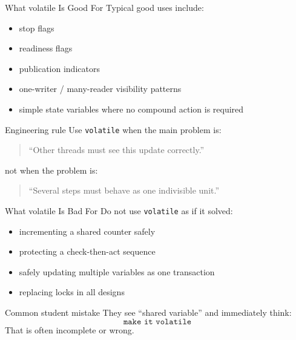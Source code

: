 \documentclass[aspectratio=169,11pt]{beamer}
\begin{document}
	\begin{frame}{What volatile Is Good For}
		Typical good uses include:
		
		\begin{itemize}
			\item stop flags
			\item readiness flags
			\item publication indicators
			\item one-writer / many-reader visibility patterns
			\item simple state variables where no compound action is required
		\end{itemize}
		
		\vspace{0.35cm}
		
		\begin{exampleblock}{Engineering rule}
			Use \texttt{volatile} when the main problem is:
			\begin{quote}
				``Other threads must see this update correctly.''
			\end{quote}
			not when the problem is:
			\begin{quote}
				``Several steps must behave as one indivisible unit.''
			\end{quote}
		\end{exampleblock}
	\end{frame}
	
	\begin{frame}{What volatile Is Bad For}
		Do not use \texttt{volatile} as if it solved:
		
		\begin{itemize}
			\item incrementing a shared counter safely
			\item protecting a check-then-act sequence
			\item safely updating multiple variables as one transaction
			\item replacing locks in all designs
		\end{itemize}
		
		\vspace{0.35cm}
		
		\begin{alertblock}{Common student mistake}
			They see ``shared variable'' and immediately think:
			\[
			\texttt{make it volatile}
			\]
			That is often incomplete or wrong.
		\end{alertblock}
	\end{frame}
	
\end{document}

